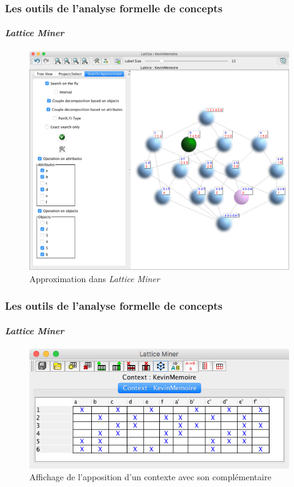 \documentclass[french]{beamer}
\newcommand{\lm}{\emph{Lattice Miner}\xspace}
\begin{document}
\begin{frame}
\frametitle{Les outils de l'analyse formelle de concepts}
\framesubtitle{\lm}
\begin{figure}[H]
\caption{Approximation dans \lm}
\label{cap:fig:lm-approxime}
\begin{center}\includegraphics[scale=0.22]{figures/Approxime.PNG}\end{center}
\end{figure}
\end{frame}
\begin{frame}
\frametitle{Les outils de l'analyse formelle de concepts}
\framesubtitle{\lm}
\begin{figure}[H]
\caption{Affichage de l'apposition d'un contexte avec son complémentaire}
\label{cap:fig:lm-complem-ctx}
\begin{center}\includegraphics[scale=0.45]{figures/lm-complem-ctx.jpg}\end{center}
\end{figure}
\end{frame}
\end{document}
